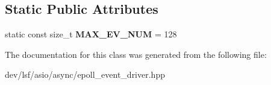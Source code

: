 \subsection*{Static Public Attributes}
\begin{DoxyCompactItemize}
\item 
\hypertarget{classlsf_1_1asio_1_1async_1_1EpollEventDriver_a0cecd06753755ca5a68350ad6a9804bd}{
static const size\_\-t {\bfseries MAX\_\-EV\_\-NUM} = 128}
\label{classlsf_1_1asio_1_1async_1_1EpollEventDriver_a0cecd06753755ca5a68350ad6a9804bd}

\end{DoxyCompactItemize}


The documentation for this class was generated from the following file:\begin{DoxyCompactItemize}
\item 
dev/lsf/asio/async/epoll\_\-event\_\-driver.hpp\end{DoxyCompactItemize}
